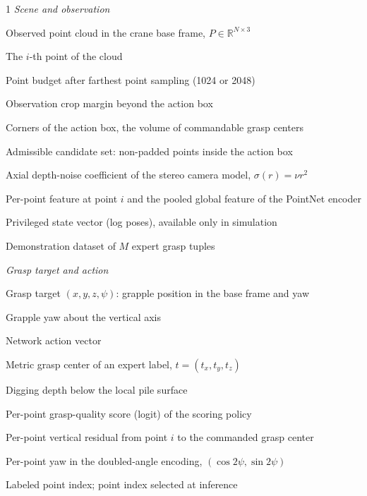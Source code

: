 \documentclass[12pt, letterpaper]{report}
\begin{document}
\begin{spacing}{1}
\vspace{4mm}
\noindent\textit{Scene and observation}
\begin{description}[leftmargin=3.2em, style=sameline]
\item[$P$] Observed point cloud in the crane base frame, $P \in \mathbb{R}^{N \times 3}$
\item[$p_i$] The $i$-th point of the cloud
\item[$N$] Point budget after farthest point sampling (1024 or 2048)
\item[$m$] Observation crop margin beyond the action box
\item[$b^{\min}, b^{\max}$] Corners of the action box, the volume of commandable grasp centers
\item[$\mathcal{C}$] Admissible candidate set: non-padded points inside the action box
\item[$\nu$] Axial depth-noise coefficient of the stereo camera model, $\sigma(r) = \nu r^2$
\item[$h_i$, $g$] Per-point feature at point $i$ and the pooled global feature of the PointNet encoder
\item[$\xi_t$] Privileged state vector (log poses), available only in simulation
\item[$\mathcal{D}$] Demonstration dataset of $M$ expert grasp tuples
\end{description}

\noindent\textit{Grasp target and action}
\begin{description}[leftmargin=3.2em, style=sameline]
\item[$\mathbf{g}$] Grasp target $(x, y, z, \psi)$: grapple position in the base frame and yaw
\item[$\psi$] Grapple yaw about the vertical axis
\item[$a$] Network action vector
\item[$t$] Metric grasp center of an expert label, $t = (t_x, t_y, t_z)$
\item[$d$] Digging depth below the local pile surface
\item[$s_i$] Per-point grasp-quality score (logit) of the scoring policy
\item[$\delta_i$] Per-point vertical residual from point $i$ to the commanded grasp center
\item[$q_i$] Per-point yaw in the doubled-angle encoding, $(\cos 2\psi, \sin 2\psi)$
\item[$i^{*}$, $\hat{\imath}$] Labeled point index; point index selected at inference
\end{description}


\end{spacing}
\end{document}

